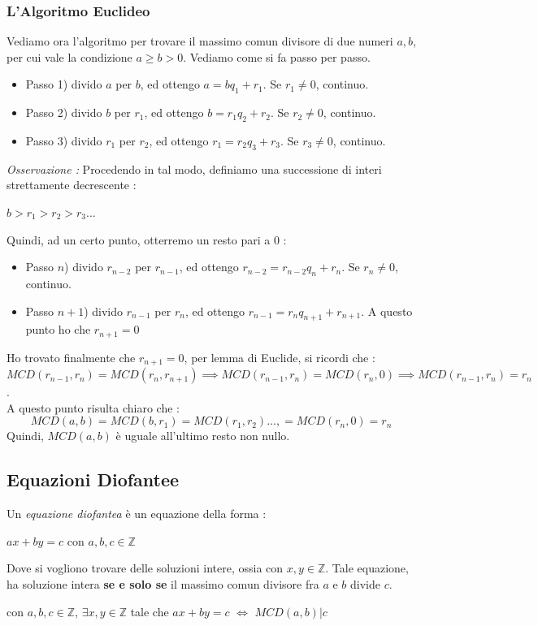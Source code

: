 \documentclass[12pt, letterpaper]{article}
\begin{document}
\subsubsection{L'Algoritmo Euclideo}\label{algEuclideo}
Vediamo ora l'algoritmo per trovare il massimo comun divisore di due numeri \(a,b\), per cui vale la 
condizione \(a\ge b>0\). Vediamo come si fa passo per passo.
\begin{itemize}
    \item Passo 1) divido \(a\) per \(b\), ed ottengo \(a=bq_1+r_1\). Se \(r_1\ne 0\), continuo. 
    \item Passo 2) divido \(b\) per \(r_1\), ed ottengo \(b=r_1q_2+r_2\). Se \(r_2\ne 0\), continuo.
    \item Passo 3) divido \(r_1\) per \(r_2\), ed ottengo \(r_1=r_2q_3+r_3\). Se \(r_3\ne 0\), continuo.
\end{itemize}
\textit{Osservazione :} Procedendo in tal modo, definiamo una successione di interi strettamente decrescente :\begin{center}
    \(b>r_1>r_2>r_3...\)
\end{center}
Quindi, ad un certo punto, otterremo un resto pari a 0 : 
\begin{itemize}
    \item Passo \(n\)) divido \(r_{n-2}\) per \(r_{n-1}\), ed ottengo \(r_{n-2}=r_{n-2}q_n+r_n\). Se \(r_n\ne 0\), continuo.
    \item Passo \(n+1\)) divido \(r_{n-1}\) per \(r_{n}\), ed ottengo \(r_{n-1}=r_{n}q_{n+1}+r_{n+1}\). A questo punto ho che 
    \(r_{n+1}=0\)
\end{itemize}
Ho trovato finalmente che \(r_{n+1}=0\), per lemma di Euclide, si ricordi che : \(MCD(r_{n-1},r_{n})=MCD(r_{n},r_{n+1})\implies MCD(r_{n-1},r_{n})=MCD(r_{n},0)\implies MCD(r_{n-1},r_{n})=r_n\).
\\ A questo punto risulta chiaro che :\begin{equation}
    MCD(a,b)=MCD(b,r_1)=MCD(r_1,r_2)...,=MCD(r_n,0)=r_n
\end{equation}
Quindi, \(MCD(a,b)\) è uguale all'ultimo resto non nullo.
\subsection{Equazioni Diofantee}\label{eqDiof}
Un \textit{equazione diofantea} è un equazione della forma :\begin{center}
    \(ax+by=c\) con \(a,b,c\in\mathbb{Z}\)
\end{center}
Dove si vogliono trovare delle soluzioni intere, ossia con \(x,y\in \mathbb{Z}\). Tale equazione, 
ha soluzione intera \textbf{se e solo se} il massimo comun divisore fra \(a\) e \(b\) divide \(c\).
\begin{center}
    con \(a,b,c\in\mathbb{Z}\), \(\exists x,y \in \mathbb{Z}\) tale che  \(ax+by=c\) \(\iff\) \(MCD(a,b)|c\)  
\end{center}
\end{document}
